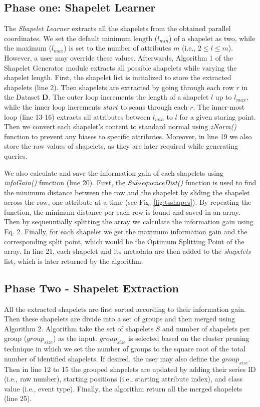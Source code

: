 \documentclass[conference]{IEEEtran}  %
\begin{document}
\subsection{Phase one: Shapelet Learner}
The \textit{Shapelet Learner} extracts all the shapelets from the obtained parallel coordinates. We set the default minimum length ($l_{min}$) of a shapelet as two, while the maximum ($l_{max}$) is set to the number of attributes $m$ (i.e., $2 \leq l \leq m$). However, a user may override these values. Afterwards, Algorithm 1 of the Shapelet Generator module extracts all possible shapelets while varying the shapelet length. First, the shapelet list is initialized to store the extracted shapelets (line 2). Then shapelets are extracted by going through each row $r$ in the Dataset \textbf{D}. The outer loop increments the length of a shapelet $l$ up to $l_{max}$, while the inner loop increments $start$ to scans through each $r$. The inner-most loop (line 13-16) extracts all attributes between $l_{min}$ to $l$ for a given staring point. Then we convert each shapelet’s content to standard normal using \textit{zNorm()} function to prevent any biases to specific attributes. Moreover, in line 19 we also store the raw values of shapelets, as they are later required while generating queries. 

We also calculate and save the information gain of each shapelets using \textit{infoGain()} function (line 20). First, the \textit{SubsequenceDist()} function is used to find the minimum distance between the row and the shapelet by sliding the shapelet across the row, one attribute at a time (see Fig. \ref{fig:tsshapes}). By repeating the function, the minimum distance per each row is found and saved in an array. Then by sequeuntially splitting the array we calculate the information gain using Eq. 2. Finally, for each shapelet we get the maximum information gain and the corresponding split point, which would be the Optimum Splitting Point of the array. In line 21, each shapelet and its metadata are then added to the \textit{shapelets} list, which is later returned by the algorithm.

\subsection{Phase Two - Shapelet Extraction}
All the extracted shapelets are first sorted according to their information gain. Then these shapelets are divide into a set of groups and then merged using Algorithm 2. Algorithm take the set of shapelets $S$ and number of shapelets per group ($group_{size}$) as the input. 
$group_{size}$ is selected based on the cluster pruning technique in which we set the number of groups to the square root of the total number of identified shapelets. If desired, the user may also define the $group_{size}$. Then in line 12 to 15 the grouped shapelets are updated by adding their series ID (i.e., raw number), starting positions (i.e., starting attribute index), and class value (i.e., event type). Finally, the algorithm return all the merged shapelets (line 25).
\end{document}
